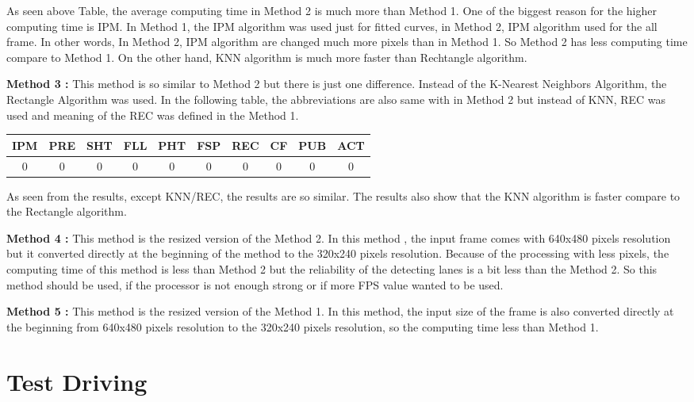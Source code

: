 As seen above Table, the average computing time in Method 2 is much more than Method 1. One of the biggest reason for the higher computing time is IPM. In Method 1, the IPM algorithm was used just for  fitted curves, in Method 2, IPM algorithm used for the all frame. In other words, In Method 2, IPM algorithm are changed much more pixels than in Method 1. So Method 2 has less computing time compare to Method 1. On the other hand, KNN algorithm  is much more faster than Rechtangle algorithm. 





\textbf{Method 3 : }This method is so similar to Method 2 but there is just one difference. Instead of the K-Nearest Neighbors Algorithm, the Rectangle Algorithm was used. In the following table, the abbreviations are also same with in Method 2 but instead of KNN, REC was used and meaning of the REC was defined in the Method 1.


\begin{center}
  \begin{tabular}{ | c | c | c | c | c | c | c | c | c | c |}
    \hline
  
  IPM 		& PRE 		& SHT	   & FLL 	   & PHT 	   & FSP 	    & REC 	   & CF 	  & PUB 	& ACT \\ \hline  
  0 & 0 & 0 & 0 & 0 & 0 & 0 & 0 & 0       & 0   \\ \hline  
    
    
      \end{tabular}
  \label{tab:Case1_Times}
\end{center}

As seen from the results, except KNN/REC, the results are so similar. The results also show that the KNN algorithm is faster compare to the Rectangle algorithm. 

\textbf{Method 4 : }This method is the resized version of the Method 2. In this method , the input frame comes with 640x480 pixels resolution but it converted directly at the beginning of the method to the 320x240 pixels resolution. Because of the processing with less pixels, the computing time of this method is less than Method 2 but the reliability of the detecting lanes is a bit less than the Method 2. So this method should be used, if the processor is not enough strong or if more FPS value wanted to be used.

\textbf{Method 5 : }This method is the resized version of the Method 1. In this method, the input size of the frame is also converted directly at the beginning from 640x480 pixels resolution to the 320x240 pixels resolution, so the computing time less than Method 1.


\section{Test Driving}\label{sec:Test Driving}
